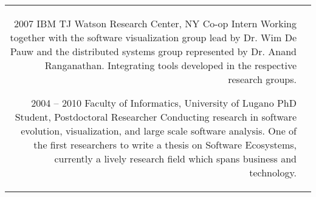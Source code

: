 \begin{tabular}{r p{12cm}}

	\job 
	{2007}
	{IBM TJ Watson Research Center, NY}
	{Co-op Intern}
	{Working together with the software visualization group lead by Dr. Wim De Pauw 
		and the distributed systems group represented by Dr. Anand Ranganathan. 
		Integrating tools developed in the respective research groups.}

	\job 
	{2004 -- 2010}
	{Faculty of Informatics, University of Lugano}
	{PhD Student, Postdoctoral Researcher}
	{Conducting research in software evolution, visualization, and large scale software analysis. One of the first researchers to write a thesis on Software Ecosystems, currently a lively research field which spans business and technology.}




\end{tabular}